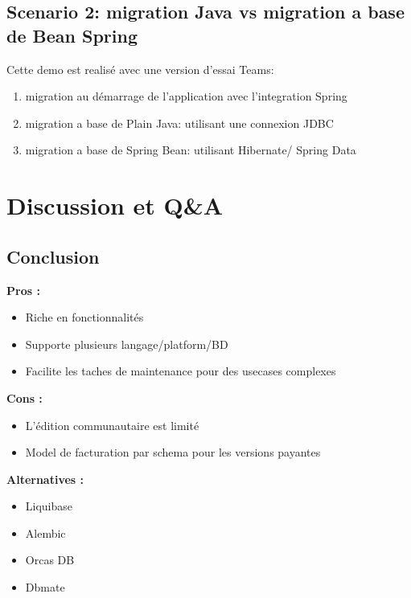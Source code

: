 \documentclass[slidestop,compress,11pt,xcolor=dvipsnames,french]{beamer}
\begin{document}
\subsection*{Scenario 2: migration Java vs migration a base de Bean Spring}
\begin{frame}
Cette demo est realisé avec une version d'essai Teams: 
\begin{enumerate}
 \item migration au démarrage de l'application avec l'integration Spring
 \item migration a base de Plain Java: utilisant une connexion JDBC
 \item migration a base de Spring Bean: utilisant Hibernate/ Spring Data
\end{enumerate}
\end{frame}

\section[Discussion]{Discussion et Q\&A}
\subsection*{Conclusion }
\begin{frame}
\textbf {Pros : \\}
\begin{itemize}
 \item Riche en fonctionnalités 
 \item Supporte plusieurs langage/platform/BD
 \item Facilite les taches de maintenance pour des usecases complexes
\end{itemize}
\textbf {Cons : \\}
\begin{itemize}
 \item L'édition communautaire est limité 
 \item Model de facturation par schema pour les versions payantes
\end{itemize}
\textbf {Alternatives : \\}
\begin{itemize}
 \item Liquibase 
 \item Alembic
 \item Orcas DB
 \item Dbmate
\end{itemize}
\end{frame}
\end{document}

